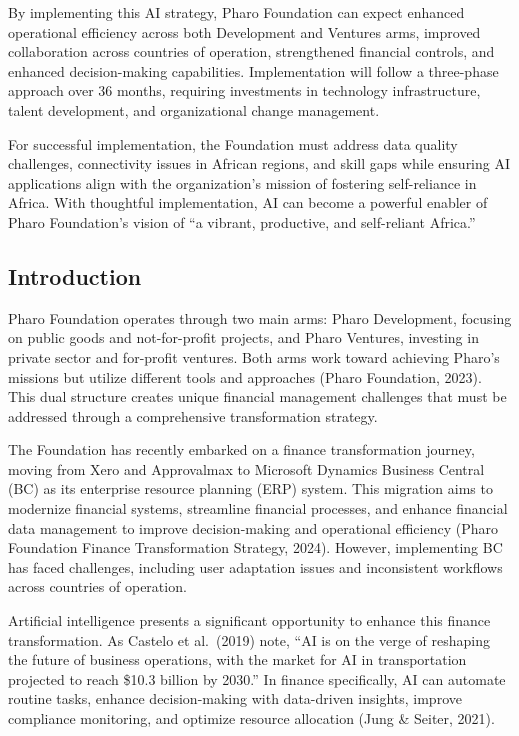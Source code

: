 \documentclass[
]{article}
\begin{document}
By implementing this AI strategy, Pharo Foundation can expect enhanced
operational efficiency across both Development and Ventures arms,
improved collaboration across countries of operation, strengthened
financial controls, and enhanced decision-making capabilities.
Implementation will follow a three-phase approach over 36 months,
requiring investments in technology infrastructure, talent development,
and organizational change management.

For successful implementation, the Foundation must address data quality
challenges, connectivity issues in African regions, and skill gaps while
ensuring AI applications align with the organization's mission of
fostering self-reliance in Africa. With thoughtful implementation, AI
can become a powerful enabler of Pharo Foundation's vision of ``a
vibrant, productive, and self-reliant Africa.''

\subsection{Introduction}\label{introduction}

Pharo Foundation operates through two main arms: Pharo Development,
focusing on public goods and not-for-profit projects, and Pharo
Ventures, investing in private sector and for-profit ventures. Both arms
work toward achieving Pharo's missions but utilize different tools and
approaches (Pharo Foundation, 2023). This dual structure creates unique
financial management challenges that must be addressed through a
comprehensive transformation strategy.

The Foundation has recently embarked on a finance transformation
journey, moving from Xero and Approvalmax to Microsoft Dynamics Business
Central (BC) as its enterprise resource planning (ERP) system. This
migration aims to modernize financial systems, streamline financial
processes, and enhance financial data management to improve
decision-making and operational efficiency (Pharo Foundation Finance
Transformation Strategy, 2024). However, implementing BC has faced
challenges, including user adaptation issues and inconsistent workflows
across countries of operation.

Artificial intelligence presents a significant opportunity to enhance
this finance transformation. As Castelo et al.~(2019) note, ``AI is on
the verge of reshaping the future of business operations, with the
market for AI in transportation projected to reach \$10.3 billion by
2030.'' In finance specifically, AI can automate routine tasks, enhance
decision-making with data-driven insights, improve compliance
monitoring, and optimize resource allocation (Jung \& Seiter, 2021).
\end{document}

